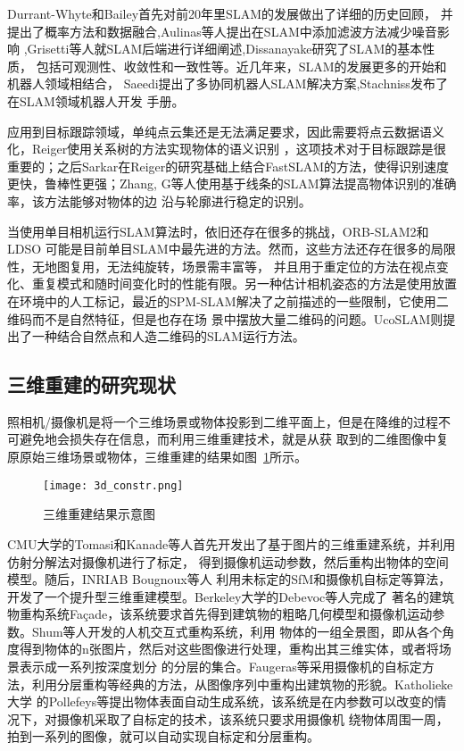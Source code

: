 Durrant-Whyte和Bailey首先对前20年里SLAM的发展做出了详细的历史回顾，
并提出了概率方法和数据融合\cite{Gibbens2000A,durrant2006simultaneous},Aulinas等人提出在SLAM中添加滤波方法减少噪音影响
\cite{cadena2016past},Grisetti等人就SLAM后端进行详细阐述\cite{grisetti2010tutorial},Dissanayake研究了SLAM的基本性质，
包括可观测性、收敛性和一致性等\cite{dissanayake2011review}。近几年来，SLAM的发展更多的开始和机器人领域相结合， 
Saeedi提出了多协同机器人SLAM解决方案\cite{saeedi2016multiple},Stachniss发布了在SLAM领域机器人开发
手册\cite{stachniss2016simultaneous}。

应用到目标跟踪领域，单纯点云集还是无法满足要求，因此需要将点云数据语义化，Reiger使用关系树的方法实现物体的语义识别
\cite{sarkar2012slam}，这项技术对于目标跟踪是很重要的；之后Sarkar在Reiger的研究基础上结合FastSLAM的方法，使得识别速度
更快，鲁棒性更强；Zhang, G等人使用基于线条的SLAM算法\cite{zhang2015building}提高物体识别的准确率，该方法能够对物体的边
沿与轮廓进行稳定的识别。

当使用单目相机运行SLAM算法时，依旧还存在很多的挑战，ORB-SLAM2\cite{mur2017orb}和LDSO\cite{gao2018ldso}
可能是目前单目SLAM中最先进的方法。然而，这些方法还存在很多的局限性，无地图复用，无法纯旋转，场景需丰富等，
并且用于重定位的方法\cite{galvez2012bags}在视点变化、重复模式和随时间变化时的性能有限。另一种估计相机姿态的方法是使用放置
在环境中的人工标记，最近的SPM-SLAM\cite{munoz2019spm}解决了之前描述的一些限制，它使用二维码而不是自然特征，但是也存在场
景中摆放大量二维码的问题。UcoSLAM\cite{munoz2019ucoslam}则提出了一种结合自然点和人造二维码的SLAM运行方法。

\subsection{三维重建的研究现状}
\label{sec:1.2.2}
照相机/摄像机是将一个三维场景或物体投影到二维平面上，但是在降维的过程不可避免地会损失存在信息，而利用三维重建技术，就是从获
取到的二维图像中复原原始三维场景或物体，三维重建的结果如图~\ref{fig:3d_constr}所示。

\begin{figure}[H] %
    \centering
    \texttt{[image: 3d\_constr.png]}
    \caption{三维重建结果示意图}
    \label{fig:3d_constr}
  \end{figure}
CMU大学的Tomasi和Kanade\cite{tomasi1992shape}等人首先开发出了基于图片的三维重建系统，并利用仿射分解法对摄像机进行了标定，
得到摄像机运动参数，然后重构出物体的空间模型。随后，INRIAB Bougnoux等人\cite{bougnoux1997totalcalib,debevec1998image}
利用未标定的SfM和摄像机自标定等算法，开发了一个提升型三维重建模型。Berkeley大学的Debevoc\cite{beardsley19963d}等人完成了
著名的建筑物重构系统Façade，该系统要求首先得到建筑物的粗略几何模型和摄像机运动参数。Shum等人开发的人机交互式重构系统，利用
物体的一组全景图，即从各个角度得到物体的n张图片，然后对这些图像进行处理，重构出其三维实体，或者将场景表示成一系列按深度划分
的分层的集合。Faugeras等采用摄像机的自标定方法，利用分层重构等经典的方法，从图像序列中重构出建筑物的形貌。Katholieke大学
的Pollefeys等提出物体表面自动生成系统，该系统是在内参数可以改变的情况下，对摄像机采取了自标定的技术，该系统只要求用摄像机
绕物体周围一周，拍到一系列的图像，就可以自动实现自标定和分层重构。

